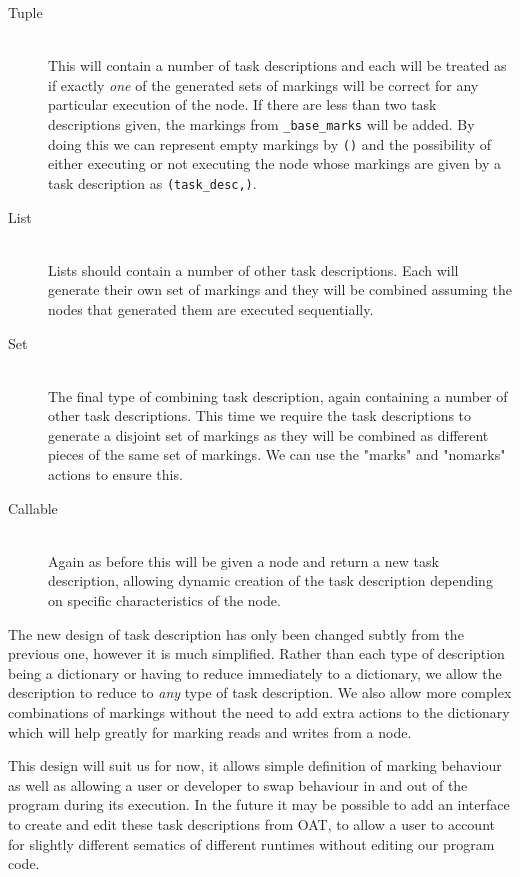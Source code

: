 \documentclass[twoside,a4paper]{report}
\begin{document}
\begin{description}
\item[Tuple] \hfill \\
This will contain a number of task descriptions and each will be treated as if exactly \textit{one} of the generated sets of markings will be correct
for any particular execution of the node. If there are less than two task descriptions given, the markings from \texttt{\_base\_marks} will be added.
By doing this we can represent empty markings by \texttt{()} and the possibility of either executing or not executing the node whose markings are
given by a task description as \texttt{(task\_desc,)}.

\item[List] \hfill \\
Lists should contain a number of other task descriptions. Each will generate their own set of markings and they will be combined assuming the nodes
that generated them are executed sequentially.

\item[Set] \hfill \\
The final type of combining task description, again containing a number of other task descriptions. This time we require the task descriptions to
generate a disjoint set of markings as they will be combined as different pieces of the same set of markings. We can use the "marks" and "nomarks"
actions to ensure this.

\item[Callable] \hfill \\
Again as before this will be given a node and return a new task description, allowing dynamic creation of the task description depending on
specific characteristics of the node.

\end{description}

The new design of task description has only been changed subtly from the previous one, however it is much simplified. Rather than each type of
description being a dictionary or having to reduce immediately to a dictionary, we allow the description to reduce to \textit{any} type of 
task description. We also allow more complex combinations of markings without the need to add extra actions to the dictionary which will
help greatly for marking reads and writes from a node.

This design will suit us for now, it allows simple definition of marking behaviour as well as allowing a user or developer to swap behaviour in
and out of the program during its execution. In the future it may be possible to add an interface to create and edit these task descriptions from
OAT, to allow a user to account for slightly different sematics of different runtimes without editing our program code.
\end{document}
